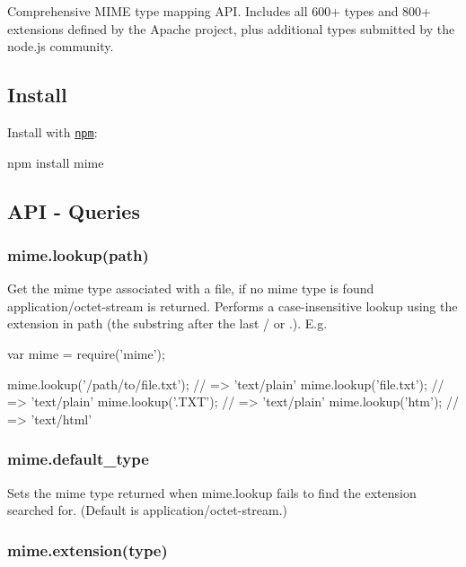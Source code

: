 Comprehensive M\+I\+ME type mapping A\+PI. Includes all 600+ types and 800+ extensions defined by the Apache project, plus additional types submitted by the node.\+js community.

\subsection*{Install}

Install with \href{http://github.com/isaacs/npm}{\tt npm}\+: \begin{DoxyVerb}npm install mime
\end{DoxyVerb}


\subsection*{A\+PI -\/ Queries}

\subsubsection*{mime.\+lookup(path)}

Get the mime type associated with a file, if no mime type is found {\ttfamily application/octet-\/stream} is returned. Performs a case-\/insensitive lookup using the extension in {\ttfamily path} (the substring after the last \textquotesingle{}/\textquotesingle{} or \textquotesingle{}.\textquotesingle{}). E.\+g. \begin{DoxyVerb}var mime = require('mime');

mime.lookup('/path/to/file.txt');         // => 'text/plain'
mime.lookup('file.txt');                  // => 'text/plain'
mime.lookup('.TXT');                      // => 'text/plain'
mime.lookup('htm');                       // => 'text/html'
\end{DoxyVerb}


\subsubsection*{mime.\+default\+\_\+type}

Sets the mime type returned when {\ttfamily mime.\+lookup} fails to find the extension searched for. (Default is {\ttfamily application/octet-\/stream}.)

\subsubsection*{mime.\+extension(type)}

